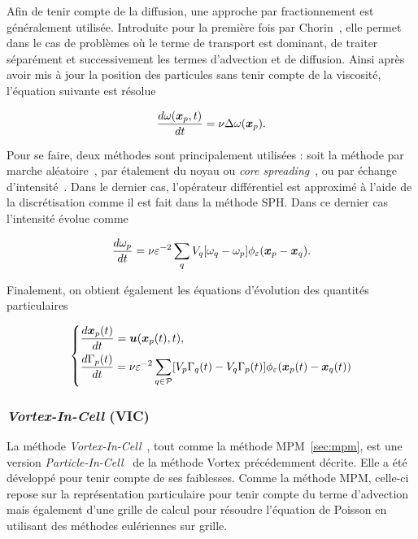 Afin de tenir compte de la diffusion, une approche par fractionnement est généralement utilisée. Introduite pour la première fois par Chorin~\cite{chorin_discretization_1973}, elle permet dans le cas de problèmes où le terme de transport est dominant, de traiter séparément et successivement les termes d'advection et de diffusion. Ainsi après avoir mis à jour la position des particules sans tenir compte de la viscosité, l'équation suivante est résolue

\begin{equation*}
    \frac{d\omega(\bm x_p, t)}{dt} = \nu \Delta \omega(\bm{x}_p).
\end{equation*}

Pour se faire, deux méthodes sont principalement utilisées : soit la méthode par marche aléatoire~\cite{chorin_discretization_1973}, par étalement du noyau ou \textit{core spreading}~\cite{LEONARD1980289}, ou par échange d'intensité~\cite{1989MaCom..53..485D}. Dans le dernier cas, l'opérateur différentiel est approximé à l'aide de la discrétisation comme il est fait dans la méthode SPH. Dans ce dernier cas l'intensité évolue comme

\begin{equation*}
    \frac{d \omega_p}{dt} = \nu \varepsilon^{-2} \sum_q V_q [\omega_q - \omega_p] \phi_\varepsilon(\bm{x}_p - \bm{x}_q).
\end{equation*}

Finalement, on obtient également les équations d'évolution des quantités particulaires

\begin{gather*}
    \left\{\begin{aligned}
         & \frac{d \bm{x}_p(t)}{dt} = \bm u(\bm{x}_p(t), t),                                                                                                      \\
         & \frac{d\Gamma_p(t)}{dt} = \nu \varepsilon^{-2} \sum_{q \in \mathcal P} [V_p \Gamma_q(t) - V_q \Gamma_p(t)] \phi_\varepsilon(\bm{x}_p(t) - \bm{x}_q(t))
    \end{aligned}\right.
\end{gather*}

\subsubsection{\textit{Vortex-In-Cell} (VIC)}

La méthode \textit{Vortex-In-Cell}~\cite{christiansen_1973}, tout comme la méthode MPM~\ref{sec:mpm}, est une version \textit{Particle-In-Cell}~\cite{birdsall_1969} de la méthode Vortex précédemment décrite. Elle a été développé pour tenir compte de ses faiblesses. Comme la méthode MPM, celle-ci repose sur la représentation particulaire pour tenir compte du terme d'advection mais également d'une grille de calcul pour résoudre l'équation de Poisson en utilisant des méthodes eulériennes sur grille.

